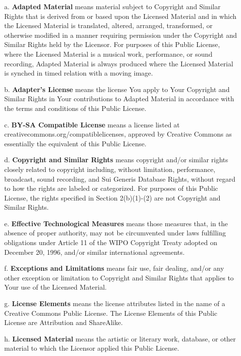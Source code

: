 \begin{itemize}
    \item[a.] \textbf{Adapted Material} means material subject to Copyright and Similar Rights that is derived from or based upon the Licensed Material and in which the Licensed Material is translated, altered, arranged, transformed, or otherwise modified in a manner requiring permission under the Copyright and Similar Rights held by the Licensor. For purposes of this Public License, where the Licensed Material is a musical work, performance, or sound recording, Adapted Material is always produced where the Licensed Material is synched in timed relation with a moving image.
    \item[b.] \textbf{Adapter's License} means the license You apply to Your Copyright and Similar Rights in Your contributions to Adapted Material in accordance with the terms and conditions of this Public License.
    \item[c.] \textbf{BY-SA Compatible License} means a license listed at creativecommons.org/compatiblelicenses, approved by Creative Commons as essentially the equivalent of this Public License.
    \item[d.] \textbf{Copyright and Similar Rights} means copyright and/or similar rights closely related to copyright including, without limitation, performance, broadcast, sound recording, and Sui Generis Database Rights, without regard to how the rights are labeled or categorized. For purposes of this Public License, the rights specified in Section 2(b)(1)-(2) are not Copyright and Similar Rights.
    \item[e.] \textbf{Effective Technological Measures} means those measures that, in the absence of proper authority, may not be circumvented under laws fulfilling obligations under Article 11 of the WIPO Copyright Treaty adopted on December 20, 1996, and/or similar international agreements.
    \item[f.] \textbf{Exceptions and Limitations} means fair use, fair dealing, and/or any other exception or limitation to Copyright and Similar Rights that applies to Your use of the Licensed Material.
    \item[g.] \textbf{License Elements} means the license attributes listed in the name of a Creative Commons Public License. The License Elements of this Public License are Attribution and ShareAlike.
    \item[h.] \textbf{Licensed Material} means the artistic or literary work, database, or other material to which the Licensor applied this Public License.

\end{itemize}
